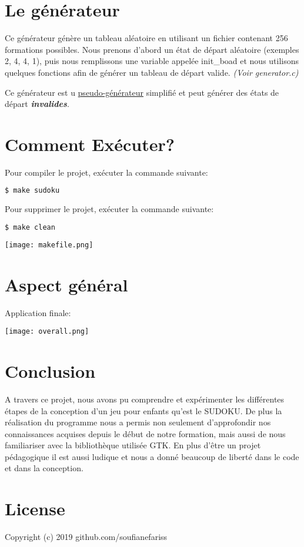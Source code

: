 \documentclass{article}
\begin{document}
\section{Le générateur}
Ce générateur génère un tableau aléatoire en utilisant un fichier contenant 256 formations possibles. Nous prenons d’abord un état de départ aléatoire (exemples 2, 4, 4, 1), puis nous remplissons une variable appelée init\_boad et nous utilisons quelques fonctions afin de générer un tableau de départ valide. 
\textit{(Voir generator.c)}

Ce générateur est u \underline {pseudo-générateur} simplifié et peut générer des états de départ \textbf{\textit{invalides}}.

\section{Comment Exécuter?}
\noindent Pour compiler le projet, exécuter la commande suivante:
\begin{lstlisting}[language=bash]
  $ make sudoku
\end{lstlisting}

\noindent Pour supprimer le projet, exécuter la commande suivante:
\begin{lstlisting}[language=bash]
  $ make clean
\end{lstlisting}

\begin{center}
\centering 
\texttt{[image: makefile.png]}
\end{center}

\newpage

\section{Aspect général}
\indent Application finale:
\begin{center}
\centering 
\texttt{[image: overall.png]}
\end{center}




\section{Conclusion}
A travers ce projet, nous avons pu comprendre et expérimenter les différentes étapes de la conception d'un jeu pour enfants qu’est le SUDOKU. 
De plus la réalisation du programme nous a permis non seulement d'approfondir nos connaissances acquises depuis le début de notre formation, mais aussi de nous familiariser avec la bibliothèque utilisée GTK.
En plus d’être un projet pédagogique il est aussi ludique et nous a donné beaucoup de liberté dans le code et dans la conception.

\section{License}
Copyright (c) 2019 github.com/soufianefariss
\doclicenseThis
\end{document}
